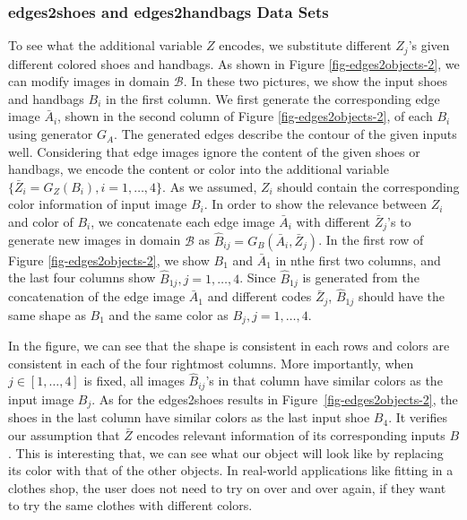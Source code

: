 \documentclass[conference]{IEEEtran}
\theoremstyle{definition}
\begin{document}

\subsubsection{{\sf edges2shoes} and {\sf edges2handbags} Data Sets} To see what the additional variable $Z$ encodes, we substitute different
$Z_j$'s given different colored shoes and handbags. As shown in Figure \ref{fig-edges2objects-2}, we can modify images in domain $\mathcal B$. In
these two pictures, we show the input shoes and handbags $B_i$ in the first column. We first generate the corresponding edge image  $\bar{A}_i$,
shown in the second column of Figure \ref{fig-edges2objects-2}, of each $B_i$ using generator $G_A$. The generated edges describe the contour of
the given inputs well. Considering that edge images ignore the content of the given shoes or handbags, we encode the content or color into the
additional variable $\{\bar{Z}_i=G_Z(B_i), i=1,\dots,4\}$. As we assumed, $Z_i$ should contain the corresponding color information of input image
$B_i$. In order to show the relevance between $Z_i$ and color of $B_i$, we concatenate each edge image $\bar{A}_i$ with different $\bar{Z}_j$'s
to generate new images in domain $\mathcal B$ as $\hat{B}_{ij}=G_B(\bar{A}_i, \bar{Z}_j)$. In the first row of Figure \ref{fig-edges2objects-2},
we show $B_1$ and $\bar{A}_1$ in nthe first two columns, and the last four columns show $\hat{B}_{1j}, j=1,\dots,4$. Since $\hat{B}_{1j}$ is
generated from the concatenation of the edge image $\bar{A}_1$ and different codes $\bar{Z}_j$, $\hat{B}_{1j}$ should have the same shape as
$B_1$ and the same color as $B_j, j=1,\dots,4$. 

In the figure, we can see that the shape is consistent in each rows and colors are consistent in each of the four rightmost columns. More
importantly, when $j\in[1,\dots,4]$ is fixed, all images $\hat{B}_{ij}$'s in that column have similar colors as the input image $B_j$. As for the
{\sf edges2shoes} results in Figure~\ref{fig-edges2objects-2}, the shoes in the last column have similar colors as the last input shoe $B_4$. It
verifies our assumption that $\bar{Z}$ encodes relevant information of its corresponding inputs $B$. This is interesting that, we can see what
our object will look like by replacing its color with that of the other objects. In real-world applications like fitting in a clothes shop, the
user does not need to try on over and over again, if they want to try the same clothes with different colors. 
\end{document}

